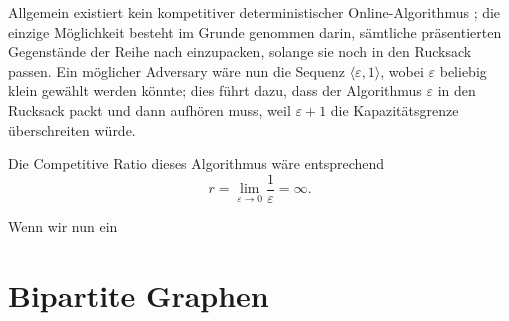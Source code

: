 \documentclass[11pt]{scrreprt} %
\theoremstyle{definition}
\begin{document}
\bigskip
Allgemein existiert kein kompetitiver deterministischer Online-Algorithmus \cite{spaccamela}; die einzige Möglichkeit besteht im Grunde genommen darin, sämtliche präsentierten Gegenstände der Reihe nach einzupacken, solange sie noch in den Rucksack passen. Ein möglicher Adversary wäre nun die Sequenz $\langle \varepsilon, 1 \rangle$, wobei $\varepsilon$ beliebig klein gewählt werden könnte; dies führt dazu, dass der Algorithmus $\varepsilon$ in den Rucksack packt und dann aufhören muss, weil $\varepsilon + 1$ die Kapazitätsgrenze überschreiten würde.

Die Competitive Ratio dieses Algorithmus wäre entsprechend
\[
	r = \lim_{\varepsilon \rightarrow 0} \frac {1} { \varepsilon} = \infty.
\]

Wenn wir nun ein 


\chapter{Bipartite Graphen}















\end{document}

